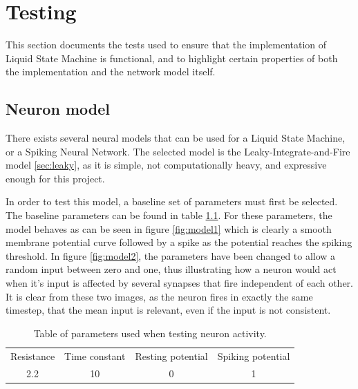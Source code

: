 \chapter{Testing}

This section documents the tests used to ensure that the implementation of Liquid State Machine is functional, and to highlight certain properties of both the implementation and the network model itself.

\section{Neuron model}

There exists several neural models that can be used for a Liquid State Machine, or a Spiking Neural Network. The selected model is the Leaky-Integrate-and-Fire model \ref{sec:leaky}, as it is simple, not computationally heavy, and expressive enough for this project.

In order to test this model, a baseline set of parameters must first be selected. The baseline parameters can be found in table \ref{tab:neuron}. For these parameters, the model behaves as can be seen in figure \ref{fig:model1} which is clearly a smooth membrane potential curve followed by a spike as the potential reaches the spiking threshold. In figure \ref{fig:model2}, the parameters have been changed to allow a random input between zero and one, thus illustrating how a neuron would act when it's input is affected by several synapses that fire independent of each other. It is clear from these two images, as the neuron fires in exactly the same timestep, that the mean input is relevant, even if the input is not consistent.

\begin{table}[h]
\centering
\begin{tabular}{cccc}
Resistance & Time constant & Resting potential & Spiking potential\\
2.2 & 10 & 0 & 1  
\end{tabular}
\caption{Table of parameters used when testing neuron activity.}
\label{tab:neuron}
\end{table}

